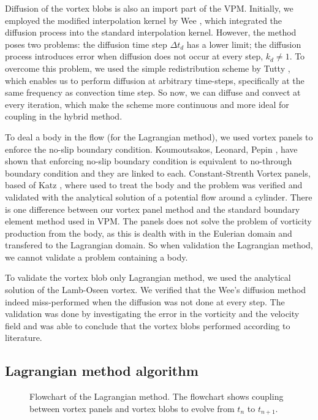 Diffusion of the vortex blobs is also an import part of the VPM. Initially, we employed the modified interpolation kernel by Wee \cite{}, which integrated the diffusion process into the standard interpolation kernel. However, the method poses two problems: the diffusion time step $\Delta t_d$ has a lower limit; the diffusion process introduces error when diffusion does not occur at every step, $k_d \neq 1$. To overcome this problem, we used the simple redistribution scheme by Tutty \cite{}, which enables us to perform diffusion at arbitrary time-steps, specifically at the same frequency as convection time step. So now, we can diffuse and convect at every iteration, which make the scheme more continuous and more ideal for coupling in the hybrid method.

To deal a body in the flow (for the Lagrangian method), we used vortex panels to enforce the no-slip boundary condition. Koumoutsakos, Leonard, Pepin \cite{}, have shown that enforcing no-slip boundary condition is equivalent to no-through boundary condition and they are linked to each. Constant-Strenth Vortex panels, based of Katz \cite{}, where used to treat the body and the problem was verified and validated with the analytical solution of a potential flow around a cylinder. There is one difference between our vortex panel method and the standard boundary element method used in VPM. The panels does not solve the problem of vorticity production from the body, as this is dealth with in the Eulerian domain and transfered to the Lagrangian domain. So when validation the Lagrangian method, we cannot validate a problem containing a body.

To validate the vortex blob only Lagrangian method, we used the analytical solution of the Lamb-Oseen vortex. We verified that the Wee's diffusion method indeed miss-performed when the diffusion was not done at every step. The validation was done by investigating the error in the vorticity and the velocity field and was able to conclude that the vortex blobs performed according to literature.

\subsection*{Lagrangian method algorithm}

	\begin{figure}[!t]
		\centering
		\caption{Flowchart of the Lagrangian method. The flowchart shows coupling between vortex panels and vortex blobs to evolve from $t_n$ to $t_{n+1}$.}
		\label{fig:flowchart_lagrangian}
	\end{figure}
	

